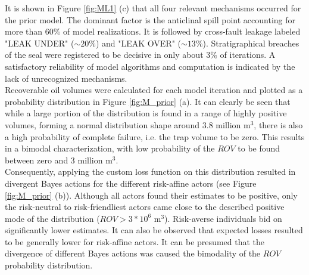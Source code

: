 		It is shown in Figure \ref{fig:ML1} (c) that all four relevant mechanisms occurred for the prior model. The dominant factor is the anticlinal spill point accounting for more than 60\% of model realizations. It is followed by cross-fault leakage labeled "LEAK UNDER" ($\sim20\%$) and "LEAK OVER" ($\sim13\%$). Stratigraphical breaches of the seal were registered to be decisive in only about 3\% of iterations. A satisfactory reliability of model algorithms and computation is indicated by the lack of unrecognized mechanisms.\\
		Recoverable oil volumes were calculated for each model iteration and plotted as a probability distribution in Figure \ref{fig:M_prior} (a). It can clearly be seen that while a large portion of the distribution is found in a range of highly positive volumes, forming a normal distribution shape around 3.8 million m$^3$, there is also a high probability of complete failure, i.e. the trap volume to be zero. This results in a bimodal characterization, with low probability of the $ROV$ to be found between zero and 3 million m$^3$.\\
		Consequently, applying the custom loss function on this distribution resulted in divergent Bayes actions for the different risk-affine actors (see Figure \ref{fig:M_prior} (b)). Although all actors found their estimates to be positive, only the risk-neutral to risk-friendliest actors came close to the described positive mode of the distribution ($ROV > 3*10^6$ m$^3$). Risk-averse individuals bid on significantly lower estimates. It can also be observed that expected losses resulted to be generally lower for risk-affine actors. It can be presumed that the divergence of different Bayes actions was caused the bimodality of the $ROV$ probability distribution.
		
